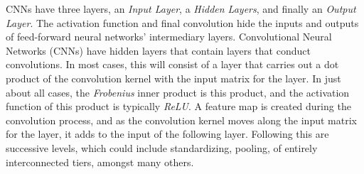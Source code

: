 \documentclass[conference]{IEEEtran}
\begin{document}
CNNs have three layers, an \textit{Input Layer}, a \textit{Hidden Layers}, and finally an \textit{Output Layer}. The activation function and final convolution hide the inputs and outputs of feed-forward neural networks' intermediary layers. Convolutional Neural Networks (CNNs) have hidden layers that contain layers that conduct convolutions. In most cases, this will consist of a layer that carries out a dot product of the convolution kernel with the input matrix for the layer. In just about all cases, the \textit{Frobenius} inner product is this product, and the activation function of this product is typically \textit{ReLU}. A feature map is created during the convolution process, and as the convolution kernel moves along the input matrix for the layer, it adds to the input of the following layer. Following this are successive levels, which could include standardizing, pooling, of entirely interconnected tiers, amongst many others.
\end{document}
